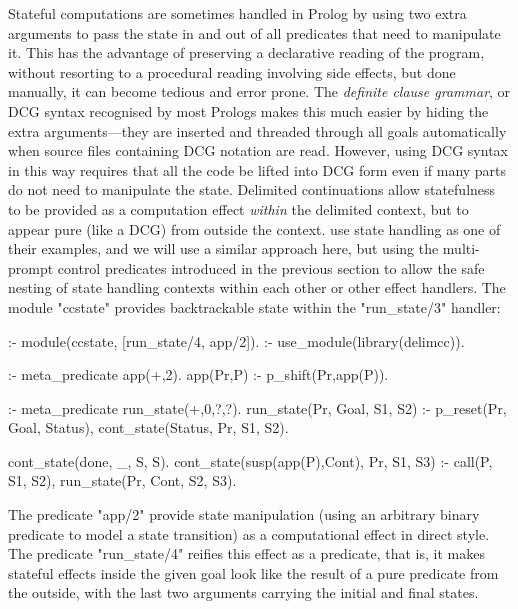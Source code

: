 Stateful computations are sometimes handled in Prolog by using two extra arguments to pass the state in and out
of all predicates that need to manipulate it. This has the advantage of preserving a  
declarative reading of the program, without resorting to a procedural reading involving side effects, but done 
manually, it can become tedious and
error prone. The \emph{definite clause grammar}, or DCG syntax \cite{PereiraWarren1980}
recognised by most Prologs makes this much easier by hiding the extra arguments---they are inserted and
threaded through all goals automatically when source files containing DCG notation
are read. However, using DCG syntax in this way requires that all the code be lifted into DCG form
even if many parts do not need to manipulate the state. Delimited continuations allow statefulness
to be provided as a computation effect \emph{within} the delimited context, but to appear pure
(like a DCG) from outside the context. \cite{SchrijversDemoenDesouter2013} use state handling
as one of their examples, and we will use a similar approach here, but using the multi-prompt
control predicates introduced in the previous section to allow the safe nesting of state handling
contexts within each other or other effect handlers. The module "ccstate" provides backtrackable
state within the "run_state/3" handler:
\begin{prolog-framed}[name=ccstate]
  :- module(ccstate, [run_state/4, app/2]).
  :- use_module(library(delimcc)).

  :- meta_predicate app(+,2).
  app(Pr,P)  :- p_shift(Pr,app(P)).

  :- meta_predicate run_state(+,0,?,?).
  run_state(Pr, Goal, S1, S2) :- 
     p_reset(Pr, Goal, Status), 
     cont_state(Status, Pr, S1, S2).

  cont_state(done, _, S, S).
  cont_state(susp(app(P),Cont), Pr, S1, S3) :- 
    call(P, S1, S2), 
    run_state(Pr, Cont, S2, S3).
\end{prolog-framed}
The predicate "app/2" provide state manipulation (using an arbitrary binary predicate
to model a state transition) as a
computational effect in direct style. The predicate "run_state/4" reifies this effect
as a predicate, that is, it makes stateful effects inside the given goal look like the result
of a pure predicate from the outside, with the last two arguments carrying the initial and final
states.

